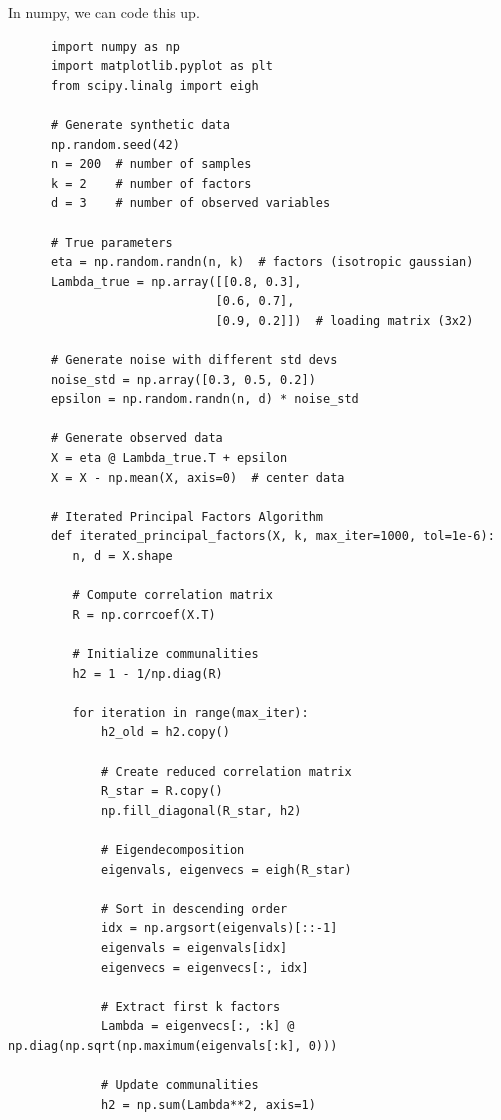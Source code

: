   \begin{example}
    \label{ex:code-walkthrough}
    In numpy, we can code this up. 

    \begin{lstlisting}
      import numpy as np
      import matplotlib.pyplot as plt
      from scipy.linalg import eigh

      # Generate synthetic data
      np.random.seed(42)
      n = 200  # number of samples
      k = 2    # number of factors
      d = 3    # number of observed variables

      # True parameters
      eta = np.random.randn(n, k)  # factors (isotropic gaussian)
      Lambda_true = np.array([[0.8, 0.3],
                             [0.6, 0.7], 
                             [0.9, 0.2]])  # loading matrix (3x2)

      # Generate noise with different std devs
      noise_std = np.array([0.3, 0.5, 0.2])
      epsilon = np.random.randn(n, d) * noise_std

      # Generate observed data
      X = eta @ Lambda_true.T + epsilon
      X = X - np.mean(X, axis=0)  # center data

      # Iterated Principal Factors Algorithm
      def iterated_principal_factors(X, k, max_iter=1000, tol=1e-6):
         n, d = X.shape
         
         # Compute correlation matrix
         R = np.corrcoef(X.T)
         
         # Initialize communalities
         h2 = 1 - 1/np.diag(R)
         
         for iteration in range(max_iter):
             h2_old = h2.copy()
             
             # Create reduced correlation matrix
             R_star = R.copy()
             np.fill_diagonal(R_star, h2)
             
             # Eigendecomposition
             eigenvals, eigenvecs = eigh(R_star)
             
             # Sort in descending order
             idx = np.argsort(eigenvals)[::-1]
             eigenvals = eigenvals[idx]
             eigenvecs = eigenvecs[:, idx]
             
             # Extract first k factors
             Lambda = eigenvecs[:, :k] @ np.diag(np.sqrt(np.maximum(eigenvals[:k], 0)))
             
             # Update communalities
             h2 = np.sum(Lambda**2, axis=1)
             

\end{lstlisting}
\end{example}
